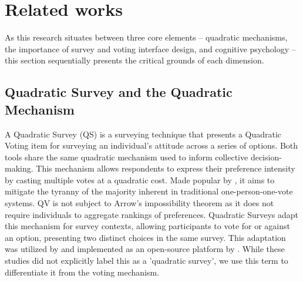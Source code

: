 \section{Related works}
\label{sec:relatedWorks}
As this research situates between three core elements -- quadratic mechanisms, the importance of survey and voting interface design, and cognitive psychology -- this section sequentially presents the critical grounds of each dimension.

\subsection{Quadratic Survey and the Quadratic Mechanism}
A Quadratic Survey (QS) is a surveying technique that presents a Quadratic Voting item for surveying an individual's attitude across a series of options. Both tools share the same quadratic mechanism used to inform collective decision-making. This mechanism allows respondents to express their preference intensity by casting multiple votes at a quadratic cost. Made popular by \textcite{posner2018radical, lalley2018quadratic}, it aims to mitigate the tyranny of the majority inherent in traditional one-person-one-vote systems. QV is not subject to Arrow's impossibility theorem as it does not require individuals to aggregate rankings of preferences.  Quadratic Surveys adapt this mechanism for survey contexts, allowing participants to vote for or against an option, presenting two distinct choices in the same survey. This adaptation was utilized by \textcite{quarfoot2017quadratic} and implemented as an open-source platform by \textcite{bassettiCivicbaseOpensourcePlatform2023}. While these studies did not explicitly label this as a 'quadratic survey', we use this term to differentiate it from the voting mechanism.

